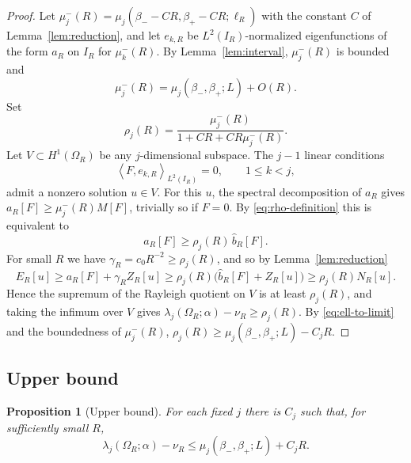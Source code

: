 \documentclass[11pt,a4paper]{article}
\numberwithin{equation}{section}
\theoremstyle{paperplain}
\newtheorem{proposition}[theorem]{Proposition}
\theoremstyle{remark}
\newcommand{\ip}[2]{\left\langle#1,#2\right\rangle}
\begin{document}
\begin{proof}
Let $\mu_j^-(R)=\mu_j(\beta_--CR,\beta_+-CR;\ell_R)$ with the constant $C$ of
Lemma~\ref{lem:reduction}, and let $e_{k,R}$ be $L^2(I_R)$-normalized
eigenfunctions of the form $a_R$ on $I_R$ for $\mu_k^-(R)$. By
Lemma~\ref{lem:interval}, $\mu_j^-(R)$ is bounded and
\begin{equation}\label{eq:ell-to-limit}
 \mu_j^-(R)=\mu_j(\beta_-,\beta_+;L)+O(R).
\end{equation}
Set
\begin{equation}\label{eq:rho-definition}
 \rho_j(R)=\frac{\mu_j^-(R)}{1+CR+CR\mu_j^-(R)}.
\end{equation}
Let $V\subset H^1(\Omega_R)$ be any $j$-dimensional subspace. The $j-1$
linear conditions
\[
 \ip{F}{e_{k,R}}_{L^2(I_R)}=0,\qquad 1\le k<j,
\]
admit a nonzero solution $u\in V$. For this $u$, the spectral decomposition
of $a_R$ gives $a_R[F]\ge\mu_j^-(R)M[F]$, trivially so if $F=0$. By
\eqref{eq:rho-definition} this is equivalent to
\[
 a_R[F]\ge\rho_j(R)\,\widehat b_R[F].
\]
For small $R$ we have $\gamma_R=c_0R^{-2}\ge\rho_j(R)$, and so by
Lemma~\ref{lem:reduction}
\[
 E_R[u]\ge a_R[F]+\gamma_RZ_R[u]
 \ge\rho_j(R)\bigl(\widehat b_R[F]+Z_R[u]\bigr)\ge\rho_j(R)N_R[u].
\]
Hence the supremum of the Rayleigh quotient on $V$ is at least $\rho_j(R)$,
and taking the infimum over $V$ gives
$\lambda_j(\Omega_R;\alpha)-\nu_R\ge\rho_j(R)$. By
\eqref{eq:ell-to-limit} and the boundedness of $\mu_j^-(R)$,
$\rho_j(R)\ge\mu_j(\beta_-,\beta_+;L)-C_jR$.
\end{proof}

\subsection{Upper bound}
\begin{proposition}[Upper bound]\label{prop:upper}
For each fixed $j$ there is $C_j$ such that, for sufficiently small $R$,
\begin{equation}\label{eq:main-upper}
 \lambda_j(\Omega_R;\alpha)-\nu_R\le\mu_j(\beta_-,\beta_+;L)+C_jR.
\end{equation}
\end{proposition}
\end{document}
